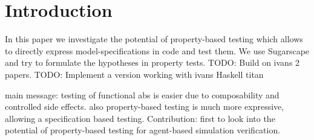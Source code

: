 \section{Introduction}

In this paper we investigate the potential of property-based testing which allows to directly express model-specifications in code and test them. We use Sugarscape and try to formulate the hypotheses in property tests.
TODO: Build on ivans 2 papers.
TODO: Implement a version working with ivans Haskell titan

main message: testing of functional abs is easier due to composability and controlled side effects. also property-based testing is much more expressive, allowing a specification based testing. 
Contribution: first to look into the potential of property-based testing for agent-based simulation verification. 